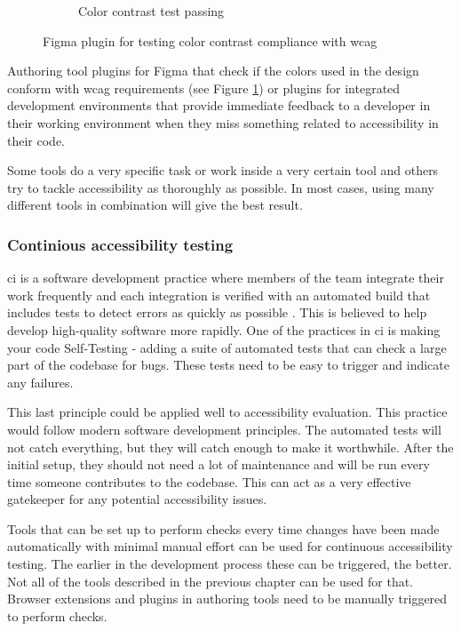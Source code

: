 \documentclass{master_thesis}
\begin{document}
\begin{figure}[h]
\begin{subfigure}{0.4\textwidth}
		\caption{Color contrast test passing}
	\end{subfigure}
\caption{Figma plugin for testing color contrast compliance with \ac{wcag}}
\label{fig:figma-plugin}
\end{figure}

Authoring tool plugins for Figma that check if the colors used in the design conform with \ac{wcag} requirements (see Figure \ref{fig:figma-plugin}) or plugins for integrated development environments that provide immediate feedback to a developer in their working environment when they miss something related to accessibility in their code.

Some tools do a very specific task or work inside a very certain tool and others try to tackle accessibility as thoroughly as possible. In most cases, using many different tools in combination will give the best result.

\subsubsection{Continious accessibility testing}

\Ac{ci} is a software development practice where members of the team integrate their work frequently and each integration is verified with an automated build that includes tests to detect errors as quickly as possible \citep{Fowler2006}. This is believed to help develop high-quality software more rapidly. One of the practices in \ac{ci} is making your code Self-Testing - adding a suite of automated tests that can check a large part of the codebase for bugs. These tests need to be easy to trigger and indicate any failures.

This last principle could be applied well to accessibility evaluation. This practice would follow modern software development principles. The automated tests will not catch everything, but they will catch enough to make it worthwhile. After the initial setup, they should not need a lot of maintenance and will be run every time someone contributes to the codebase. This can act as a very effective gatekeeper for any potential accessibility issues.

Tools that can be set up to perform checks every time changes have been made automatically with minimal manual effort can be used for continuous accessibility testing. The earlier in the development process these can be triggered, the better. Not all of the tools described in the previous chapter can be used for that. Browser extensions and plugins in authoring tools need to be manually triggered to perform checks.
\end{document}
